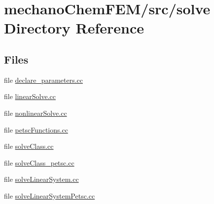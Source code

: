 \section{mechano\+Chem\+F\+E\+M/src/solve Directory Reference}
\label{dir_28284d899b4c01c72973addf0d42f06a}
\subsection*{Files}
\begin{DoxyCompactItemize}
\item 
file \mbox{\hyperlink{solve_2declare__parameters_8cc}{declare\+\_\+parameters.\+cc}}
\item 
file \mbox{\hyperlink{linear_solve_8cc}{linear\+Solve.\+cc}}
\item 
file \mbox{\hyperlink{nonlinear_solve_8cc}{nonlinear\+Solve.\+cc}}
\item 
file \mbox{\hyperlink{petsc_functions_8cc}{petsc\+Functions.\+cc}}
\item 
file \mbox{\hyperlink{solve_class_8cc}{solve\+Class.\+cc}}
\item 
file \mbox{\hyperlink{solve_class__petsc_8cc}{solve\+Class\+\_\+petsc.\+cc}}
\item 
file \mbox{\hyperlink{solve_linear_system_8cc}{solve\+Linear\+System.\+cc}}
\item 
file \mbox{\hyperlink{solve_linear_system_petsc_8cc}{solve\+Linear\+System\+Petsc.\+cc}}
\end{DoxyCompactItemize}
